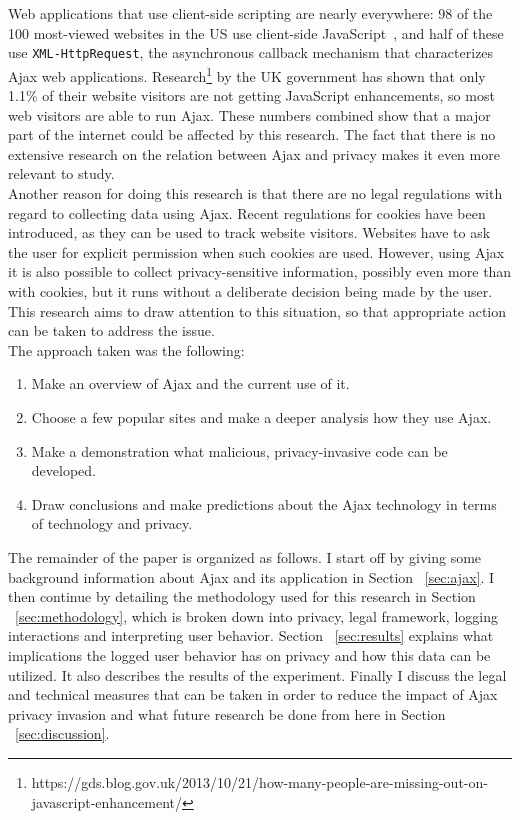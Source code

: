Web applications that use client-side scripting are nearly everywhere: 98 of the 100 most-viewed websites in the US use client-side JavaScript~\cite{intrusion}, and half of these use \verb|XML-HttpRequest|, the asynchronous callback mechanism that characterizes Ajax web applications. Research\footnote{https://gds.blog.gov.uk/2013/10/21/how-many-people-are-missing-out-on-javascript-enhancement/} by the UK government has shown that only 1.1\% of their website visitors are not getting JavaScript enhancements, so most web visitors are able to run Ajax. These numbers combined show that a major part of the internet could be affected by this research. The fact that there is no extensive research on the relation between Ajax and privacy makes it even more relevant to study.\\

Another reason for doing this research is that there are no legal regulations with regard to collecting data using Ajax. Recent regulations for cookies have been introduced, as they can be used to track website visitors. Websites have to ask the user for explicit permission when such cookies are used. However, using Ajax it is also possible to collect privacy-sensitive information, possibly even more than with cookies, but it runs without a deliberate decision being made by the user. This research aims to draw attention to this situation, so that appropriate action can be taken to address the issue.\\
	
The approach taken was the following:\\
\begin{enumerate}
	\item Make an overview of Ajax and the current use of it.
	\item Choose a few popular sites and make a deeper analysis how they use Ajax.
	\item Make a demonstration what malicious, privacy-invasive code can be developed.
	\item Draw conclusions and make predictions about the Ajax technology in terms of technology and privacy.
\end{enumerate}

The remainder of the paper is organized as follows. I start off by giving some background information about Ajax and its application in Section ~\ref{sec:ajax}. I then continue by detailing the methodology used for this research in Section ~\ref{sec:methodology}, which is broken down into privacy, legal framework, logging interactions and interpreting user behavior.  Section ~\ref{sec:results} explains what implications the logged user behavior has on privacy and how this data can be utilized. It also describes the results of the experiment. Finally I discuss the legal and technical measures that can be taken in order to reduce the impact of Ajax privacy invasion and what future research be done from here in Section ~\ref{sec:discussion}.\\

